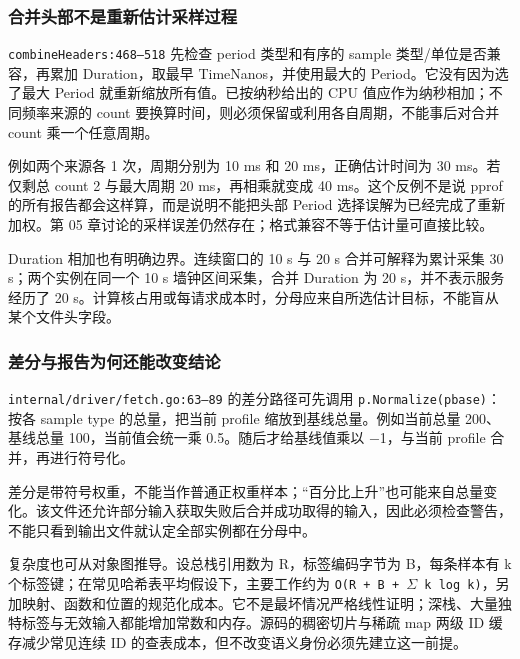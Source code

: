 \documentclass[UTF8,fontset=fandol,openany,11pt]{ctexbook}
\begin{document}
\subsubsection{合并头部不是重新估计采样过程}
\texttt{combineHea\allowbreak{}ders:\allowbreak{}468–518} 先检查 period 类型和有序的 sample 类型/单位是否兼容，再累加 Duration，取最早 TimeNanos，并使用最大的 Period。它没有因为选了最大 Period 就重新缩放所有值。已按纳秒给出的 CPU 值应作为纳秒相加；不同频率来源的 count 要换算时间，则必须保留或利用各自周期，不能事后对合并 count 乘一个任意周期。

例如两个来源各 1 次，周期分别为 10 ms 和 20 ms，正确估计时间为 30 ms。若仅剩总 count 2 与最大周期 20 ms，再相乘就变成 40 ms。这个反例不是说 pprof 的所有报告都会这样算，而是说明不能把头部 Period 选择误解为已经完成了重新加权。第 05 章讨论的采样误差仍然存在；格式兼容不等于估计量可直接比较。

Duration 相加也有明确边界。连续窗口的 10 s 与 20 s 合并可解释为累计采集 30 s；两个实例在同一个 10 s 墙钟区间采集，合并 Duration 为 20 s，并不表示服务经历了 20 s。计算核占用或每请求成本时，分母应来自所选估计目标，不能盲从某个文件头字段。

\subsubsection{差分与报告为何还能改变结论}
\texttt{internal/\allowbreak{}driver/\allowbreak{}fetch.\allowbreak{}go:\allowbreak{}63–89} 的差分路径可先调用 \texttt{p.\allowbreak{}Normalize(pbase)}：按各 sample type 的总量，把当前 profile 缩放到基线总量。例如当前总量 200、基线总量 100，当前值会统一乘 0.5。随后才给基线值乘以 \ensuremath{-}1，与当前 profile 合并，再进行符号化。

差分是带符号权重，不能当作普通正权重样本；“百分比上升”也可能来自总量变化。该文件还允许部分输入获取失败后合并成功取得的输入，因此必须检查警告，不能只看到输出文件就认定全部实例都在分母中。\cite{proj-pprof}

复杂度也可从对象图推导。设总栈引用数为 R，标签编码字节为 B，每条样本有 k 个标签键；在常见哈希表平均假设下，主要工作约为 \texttt{O(R + B + \ensuremath{\Sigma} k log k)}，另加映射、函数和位置的规范化成本。它不是最坏情况严格线性证明；深栈、大量独特标签与无效输入都能增加常数和内存。源码的稠密切片与稀疏 map 两级 ID 缓存减少常见连续 ID 的查表成本，但不改变语义身份必须先建立这一前提。
\end{document}
